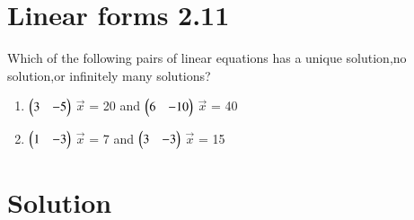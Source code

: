 \documentclass[journal,12pt,twocolumn]{IEEEtran}
\begin{document}
\section{Linear forms 2.11}

Which of the following pairs of linear equations has a unique solution,no solution,or infinitely many solutions?
\begin{enumerate}
    \item $\begin{pmatrix}3&-5\end{pmatrix}$ $\vec{x}$ = 20 and $\begin{pmatrix}6&-10\end{pmatrix}$ $\vec{x}$ = 40
    \item $\begin{pmatrix}1&-3\end{pmatrix}$ $\vec{x}$ = 7 and $\begin{pmatrix}3&-3\end{pmatrix}$ $\vec{x}$ = 15
\end{enumerate}
%
%
\section{Solution}
\end{document}
